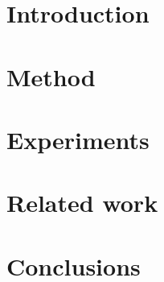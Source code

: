\documentclass[aoas,preprint,authoryear]{imsart}
\begin{document}
\section{Introduction}






\section{Method}




\section{Experiments}


\section{Related work}


\section{Conclusions}



\end{document}

